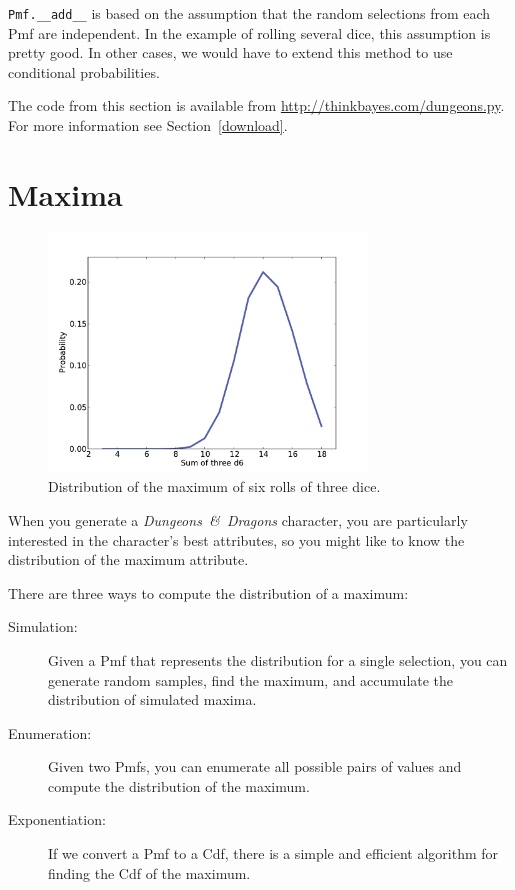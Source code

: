 \documentclass[12pt]{book}
\begin{document}
\verb"Pmf.__add__" is based on the assumption that the random
selections from each Pmf are independent.  In the example of rolling
several dice, this assumption is pretty good.  In other cases, we
would have to extend this method to use conditional probabilities.

The code from this section is available from
\url{http://thinkbayes.com/dungeons.py}.
  For more information
see Section~\ref{download}.

\section{Maxima}

\begin{figure}
\centerline{\includegraphics[height=2.5in]{figs/dungeons2.pdf}}
\caption{Distribution of the maximum of six rolls of three dice.}
\label{fig.dungeons2}
\end{figure}

When you generate a {\it Dungeons~\&~Dragons} character, you are
particularly interested in the character's best attributes, so
you might like to know the
distribution of the maximum attribute.

There are three ways to compute the distribution of a maximum:

\begin{description}

\item[Simulation:] Given a Pmf that represents the distribution
for a single selection, you can generate random samples, find the maximum,
and accumulate the distribution of simulated maxima.

\item[Enumeration:] Given two Pmfs, you can enumerate all possible
pairs of values and compute the distribution of the maximum.

\item[Exponentiation:] If we convert a Pmf to a Cdf, there is a simple
and efficient algorithm for finding the Cdf of the maximum.

\end{description}
\end{document}
